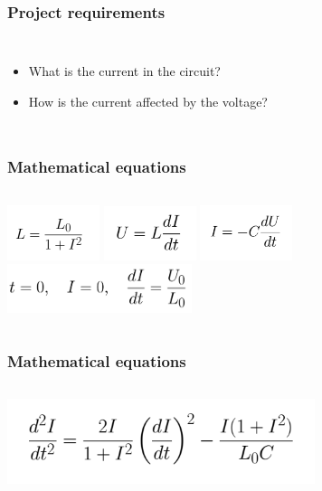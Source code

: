 \documentclass[aspectratio=1610]{beamer}
\begin{document}
\begin{frame}
\frametitle{Project requirements}
\begin{columns}
\column{37em}
\begin{itemize}\itemsep1em
  \item<1-> What is the current in the circuit?
  \item<2-> How is the current affected by the voltage?
\end{itemize}
\end{columns}
\end{frame}
\begin{frame}
\frametitle{Mathematical equations}
\begin{columns}
\column{37em}
\hspace*{2cm}\includegraphics[width=2.7cm]{figs/inductance.png}
\hspace*{2cm}\includegraphics[width=2.7cm]{figs/voltage.png}
\hspace*{2cm}\includegraphics[width=2.7cm]{figs/current.png}
\hspace*{2cm}\includegraphics[width=5.4cm]{figs/initial values.png}
\end{columns}
\end{frame}
\begin{frame}
\frametitle{Mathematical equations}
\begin{columns}
\column{37em}
\hspace*{2cm}\includegraphics[width=9cm]{figs/2nd ODE.png}
\end{columns}
\end{frame}
\end{document}
